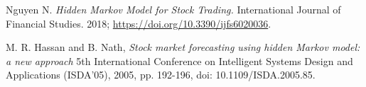 \begin{thebibliography}{9}

    Nguyen N. \emph{Hidden Markov Model for Stock Trading.} International Journal of Financial Studies. 2018; \href{https://doi.org/10.3390/ijfs6020036}{https://doi.org/10.3390/ijfs6020036}.

    M. R. Hassan and B. Nath, \emph{Stock market forecasting using hidden Markov model: a new approach} 5th International Conference on Intelligent Systems Design and Applications (ISDA'05), 2005, pp. 192-196, doi: 10.1109/ISDA.2005.85.

\end{thebibliography}

\clearpage
